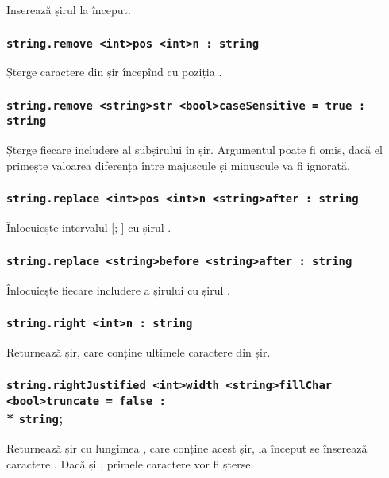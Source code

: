 Inserează șirul  la început.

\subsubsection{\lstinline|string.remove <int>pos <int>n : string|}

Șterge  caractere din șir începînd cu poziția .

\subsubsection{\lstinline|string.remove <string>str <bool>caseSensitive = true : string|}

Șterge fiecare includere al subșirului  în șir. Argumentul  poate fi omis, dacă el primește valoarea \false{} diferența între majuscule și minuscule va fi ignorată.

\subsubsection{\lstinline|string.replace <int>pos <int>n <string>after : string|}

Înlocuiește intervalul [; ] cu șirul .

\subsubsection{\lstinline|string.replace <string>before <string>after : string|}

Înlocuiește fiecare includere a șirului  cu șirul .

\subsubsection{\lstinline|string.right <int>n : string|}

Returnează șir, care conține ultimele  caractere din șir.

\subsubsection{\lstinline|string.rightJustified <int>width <string>fillChar <bool>truncate = false :|\\* \lstinline|string|;}

Returnează șir cu lungimea , care conține acest șir, la început se înserează  caractere . Dacă  și , primele  caractere vor fi șterse.

